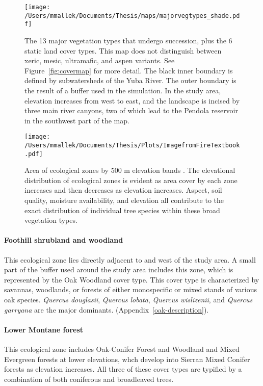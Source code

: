 \begin{figure}[!htbp]
\centering
\texttt{[image: /Users/mmallek/Documents/Thesis/maps/majorvegtypes\_shade.pdf]}
\caption{The 13 major vegetation types that undergo succession, plus the 6 static land cover types. This map does not distinguish between xeric, mesic, ultramafic, and aspen variants. See Figure~\ref{fig:covermap} for more detail. The black inner boundary is defined by subwatersheds of the Yuba River. The outer boundary is the result of a buffer used in the simulation. In the study area, elevation increases from west to east, and the landscape is incised by three main river canyons, two of which lead to the Pendola reservoir in the southwest part of the map.
}
\label{fig:majorvegtypes}
\end{figure}


\begin{figure}[!htbp]
\centering
\texttt{[image: /Users/mmallek/Documents/Thesis/Plots/ImagefromFireTextbook.pdf]}
\caption{Area of ecological zones by 500 m elevation bands \citep[269]{VanWag2006}. The elevational distribution of ecological zones is evident as area cover by each zone increases and then decreases as elevation increases. Aspect, soil quality, moisture availability, and elevation all contribute to the exact distribution of individual tree species within these broad vegetation types.}
\label{fig:ecologicalzonebands}
\end{figure}


\paragraph*{Foothill shrubland and woodland} This ecological zone lies directly adjacent to and west of the study area. A small part of the buffer used around the study area includes this zone, which is represented by the Oak Woodland cover type. This cover type is characterized by savannas, woodlands, or forests of either monospecific or mixed stands of various oak species. \emph{Quercus douglasii}, \emph{Quercus lobata}, \emph{Quercus wislizenii}, and \emph{Quercus garryana} are the major dominants. (Appendix~\ref{oak-description}). 

\paragraph*{Lower Montane forest} This ecological zone includes Oak-Conifer Forest and Woodland and Mixed Evergreen forests at lower elevations, whch develop into Sierran Mixed Conifer forests as elevation increases. All three of these cover types are typified by a combination of both coniferous and broadleaved trees. 

